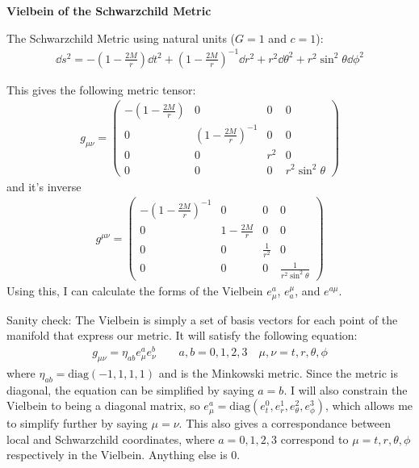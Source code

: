 \documentclass[12pt]{article}
\begin{document}
\begin{center}
  \Large\textbf{Vielbein of the Schwarzchild Metric} \\
  \large{}
\end{center}

The Schwarzchild Metric using natural units ($G = 1$ and $c = 1$):
\begin{align*}
  \dd{s}^2 = -\left(1 - \frac{2M}{r}\right)\dd{t}^2 + \left(1 - \frac{2M}{r}\right)^{-1}\dd{r}^2 + r^2\dd{\theta}^2 + r^2\sin^2{\theta}\dd{\phi}^2
\end{align*}

This gives the following metric tensor:
\begin{align*}
  g_{\mu\nu} =
  \begin{pmatrix}
  -\left(1 - \frac{2M}{r}\right) & 0 & 0 & 0 \\
  0 & \left(1 - \frac{2M}{r}\right)^{-1} & 0 & 0 \\
  0 & 0 & r^2 & 0 \\
  0 & 0 & 0 & r^2 \sin^2{\theta}
\end{pmatrix}
\end{align*}
and it's inverse
\begin{align*}
  g^{\mu\nu} =
  \begin{pmatrix}
  -\left(1 - \frac{2M}{r}\right)^{-1} & 0 & 0 & 0 \\
  0 & 1 - \frac{2M}{r} & 0 & 0 \\
  0 & 0 & \frac{1}{r^2} & 0 \\
  0 & 0 & 0 & \frac{1}{r^2 \sin^2{\theta}}
  \end{pmatrix}
\end{align*}
Using this, I can calculate the forms of the Vielbein $e^a_\mu$, $e^\mu_a$, and $e^{a\mu}$.

Sanity check: The Vielbein is simply a set of basis vectors for each point of the manifold that express our metric. It will satisfy the following equation:
\begin{align*}
  g_{\mu\nu} = \eta_{ab}e^a_\mu e^b_\nu \qquad a,b = 0,1,2,3 \quad \mu,\nu = t,r,\theta,\phi
\end{align*}
where $\eta_{ab} = \text{diag}(-1,1,1,1)$ and is the Minkowski metric. Since the metric is diagonal, the equation can be simplified by saying $a=b$. I will also constrain the Vielbein to being a diagonal matrix, so $e^a_\mu = \text{diag}(e^0_t,e^1_r,e^2_\theta,e^3_\phi)$, which allows me to simplify further by saying $\mu = \nu$. This also gives a correspondance between local and Schwarzchild coordinates, where $a = 0,1,2,3$ correspond to $\mu = t,r,\theta,\phi$ respectively in the Vielbein. Anything else is $0$.
\end{document}
